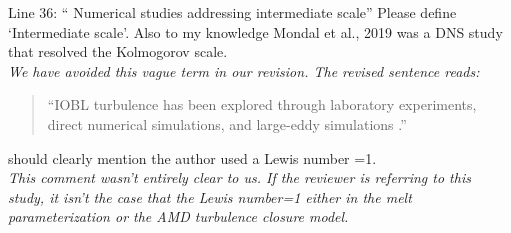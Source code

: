 \documentclass[tc, manuscript]{copernicus}
\begin{document}
Line 36: “ Numerical studies addressing intermediate scale”
Please define ‘Intermediate scale’. Also to my knowledge Mondal et al., 2019 was a DNS study that resolved the Kolmogorov scale.\\
\textit{We have avoided this vague term in our revision. The revised sentence reads:}
\begin{quote}
``IOBL turbulence has been explored through laboratory experiments, direct numerical simulations, and large-eddy simulations \citep{middleton_numerical_2021, mondal_ablation_2019, vreugdenhil_stratification_2019, mcconnochie_dissolution_2018}.''
\end{quote}\vspace{12pt}

should clearly mention the author used a Lewis number =1.\\
\textit{This comment wasn't entirely clear to us. If the reviewer is referring to this study, it isn't the case that the Lewis number=1 either in the melt parameterization or the AMD turbulence closure model.}\vspace{12pt}
\end{document}
